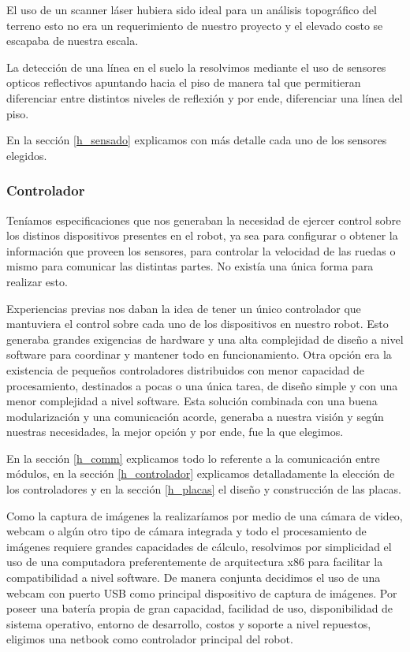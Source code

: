 El uso de un scanner l\'aser hubiera sido ideal para un an\'alisis topogr\'afico del terreno esto no era
un requerimiento de nuestro proyecto y el elevado costo se escapaba de nuestra escala.

La detecci\'on de una l\'inea en el suelo la resolvimos mediante el uso de sensores opticos reflectivos
apuntando hacia el piso de manera tal que permitieran diferenciar entre distintos niveles de reflexi\'on
y por ende, diferenciar una l\'inea del piso.

En la secci\'on \ref{h_sensado} explicamos con m\'as detalle cada uno de los sensores elegidos.

\subsubsection{Controlador}
\label{h_ideas_controlador}

Ten\'iamos especificaciones que nos generaban la necesidad de ejercer control sobre los distinos dispositivos
presentes en el robot, ya sea para configurar o obtener la informaci\'on que proveen los sensores, para
controlar la velocidad de las ruedas o mismo para comunicar las distintas partes.
No exist\'ia una \'unica forma para realizar esto.

Experiencias previas nos daban la idea de tener un \'unico controlador que mantuviera el control sobre cada uno
de los dispositivos en nuestro robot.
Esto generaba grandes exigencias de hardware y una alta complejidad de dise\~no a nivel software para coordinar
y mantener todo en funcionamiento.
Otra opci\'on era la existencia de peque\~nos controladores distribuidos con menor capacidad de procesamiento,
destinados a pocas o una \'unica tarea, de dise\~no simple y con una menor complejidad a nivel software.
Esta soluci\'on combinada con una buena modularizaci\'on y una comunicaci\'on acorde, generaba a nuestra visi\'on
y seg\'un nuestras necesidades, la mejor opci\'on y por ende, fue la que elegimos.

En la secci\'on \ref{h_comm} explicamos todo lo referente a la comunicaci\'on entre m\'odulos, en la secci\'on
\ref{h_controlador} explicamos detalladamente la elecci\'on de los controladores y en la secci\'on \ref{h_placas}
el dise\~no y construcci\'on de las placas.

Como la captura de im\'agenes la realizar\'iamos por medio de una c\'amara de video, webcam o alg\'un otro tipo
de c\'amara integrada y todo el procesamiento de im\'agenes requiere grandes capacidades de c\'alculo, resolvimos
por simplicidad el uso de una computadora preferentemente de arquitectura x86 para facilitar la compatibilidad
a nivel software.
De manera conjunta decidimos el uso de una webcam con puerto USB como principal dispositivo de captura de im\'agenes.
Por poseer una bater\'ia propia de gran capacidad, facilidad de uso, disponibilidad de sistema operativo, entorno
de desarrollo, costos y soporte a nivel repuestos, eligimos una netbook como controlador principal del robot.

